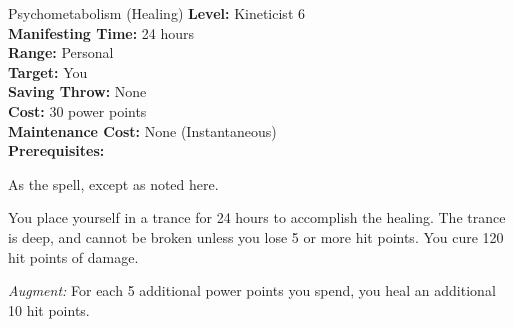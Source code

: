 {Psychometabolism (Healing)}
{
	\textbf{Level:}
	Kineticist 6\\
	\textbf{Manifesting Time:}
	24 hours\\
	\textbf{Range:}
	Personal\\
	\textbf{Target:}
	You\\
	\textbf{Saving Throw:}
	None\\
	\textbf{Cost:}
	30 power points\\
	\textbf{Maintenance Cost:}
	None (Instantaneous)\\
	\textbf{Prerequisites:}
	\\
}
{
	As the  spell, except as noted here.

	You place yourself in a trance for 24 hours to accomplish the healing. The trance is deep, and cannot be broken unless you lose 5 or more hit points. You cure 120 hit points of damage.

	\textit{Augment:} For each 5 additional power points you spend, you heal an additional 10 hit points.
}